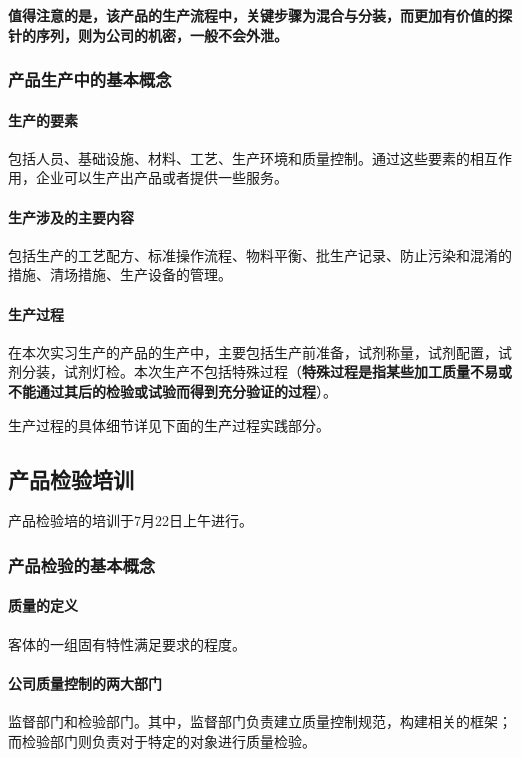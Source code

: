 \documentclass[cn,black,12pt,normal]{elegantnote}
\begin{document}
\textbf{值得注意的是，该产品的生产流程中，关键步骤为混合与分装，而更加有价值的探针的序列，则为公司的机密，一般不会外泄。}

\subsubsection{产品生产中的基本概念}

\paragraph{生产的要素} 包括人员、基础设施、材料、工艺、生产环境和质量控制。通过这些要素的相互作用，企业可以生产出产品或者提供一些服务。

\paragraph{生产涉及的主要内容} 包括生产的工艺配方、标准操作流程、物料平衡、批生产记录、防止污染和混淆的措施、清场措施、生产设备的管理。

\paragraph{生产过程} 在本次实习生产的产品的生产中，主要包括生产前准备，试剂称量，试剂配置，试剂分装，试剂灯检。本次生产不包括特殊过程（\textbf{特殊过程是指某些加工质量不易或不能通过其后的检验或试验而得到充分验证的过程}）。

生产过程的具体细节详见下面的生产过程实践部分。

\subsection{产品检验培训}
产品检验培的培训于7月22日上午进行。

\subsubsection{产品检验的基本概念}

\paragraph{质量的定义} 客体的一组固有特性满足要求的程度。

\paragraph{公司质量控制的两大部门} 监督部门和检验部门。其中，监督部门负责建立质量控制规范，构建相关的框架；而检验部门则负责对于特定的对象进行质量检验。
\end{document}
